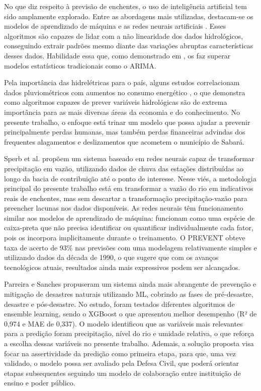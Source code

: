 \documentclass[12pt]{article}
\begin{document}
\label{sec:trabalhosrelacionados}

No que diz respeito à previsão de enchentes, o uso de inteligência artificial tem sido amplamente explorado. Entre as abordagens mais utilizadas, destacam-se os modelos de aprendizado de máquina \cite{ramos2025, parreira2025} e as redes neurais artificiais \cite{sperb1999, alberton2021}. Esses algoritmos são capazes de lidar com a não linearidade dos dados hidrológicos, conseguindo extrair padrões mesmo diante das variações abruptas características desses dados. Habilidade essa que, como demonstrado em \cite{ramos2025}, os faz superar modelos estatísticos tradicionais como o ARIMA.

Pela importância das hidrelétricas para o país, alguns estudos correlacionam dados pluviométricos com aumentos no consumo energético \cite{ramos2025}, o que demonstra como algoritmos capazes de prever variáveis hidrológicas são de extrema importância para as mais diversas áreas da economia e do conhecimento. No presente trabalho, o enfoque está trinar um modelo que possa ajudar a prevenir principalmente perdas humanas, mas também perdas financeiras advindas dos frequentes alagamentos e deslizamentos que acometem o município de Sabará.

Sperb et al. \cite{sperb1999} propõem um sistema baseado em redes neurais capaz de transformar precipitação em vazão, utilizando dados de chuva das estações distribuídas ao longo da bacia de contribuição até o ponto de interesse. Nesse viés, a metodologia principal do presente trabalho está em transformar a vazão do rio em indicativos reais de enchentes, mas sem descartar a transformação precipitação-vazão para preencher lacunas nos dados disponíveis. As redes neurais têm funcionamento similar aos modelos de aprendizado de máquina: funcionam como uma espécie de caixa-preta que não precisa identificar ou quantificar individualmente cada fator, pois os incorpora implicitamente durante o treinamento. O PREVENT obteve taxa de acerto de 93\% nas previsões com uma modelagem relativamente simples e utilizando dados da década de 1990, o que sugere que com os avanços tecnológicos atuais, resultados ainda mais expressivos podem ser alcançados.

Parreira e Sanches \cite{parreira2025} propuseram um sistema ainda mais abrangente de prevenção e mitigação de desastres naturais utilizando ML, cobrindo as fases de pré-desastre, desastre e pós-desastre. No estudo, foram testados diferentes algoritmos de ensemble learning, sendo o XGBoost o que apresentou melhor desempenho (R² de 0,974 e MAE de 0,337). O modelo identificou que as variáveis mais relevantes para a predição foram precipitação, nível do rio e umidade relativa, o que reforça a escolha dessas variáveis no presente trabalho. Ademais, a solução proposta visa focar na assertividade da predição como primeira etapa, para que, uma vez validado, o modelo possa ser avaliado pela Defesa Civil, que poderá orientar etapas subsequentes seguindo um modelo de colaboração entre instituição de ensino e poder público.
\end{document}
